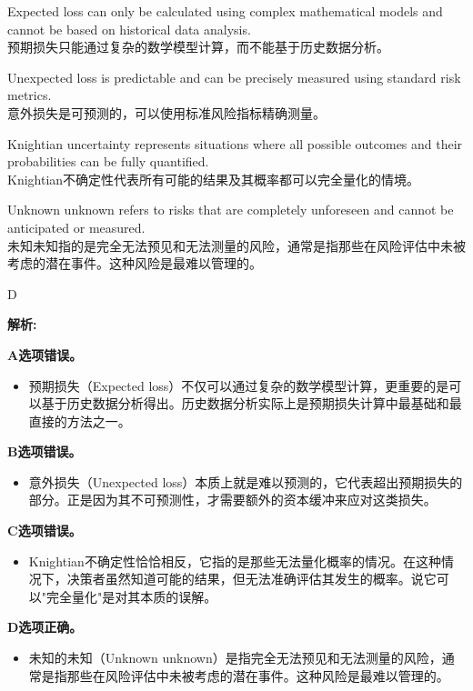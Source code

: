 \documentclass{article}
\newenvironment{explanation}
{\textbf{解析:}\par}
{\par}
\begin{document}
\begin{choices}
    \item Expected loss can only be calculated using complex mathematical models and cannot be based on historical data analysis.\\
    预期损失只能通过复杂的数学模型计算，而不能基于历史数据分析。
    \item Unexpected loss is predictable and can be precisely measured using standard risk metrics.\\
    意外损失是可预测的，可以使用标准风险指标精确测量。
    
    \item Knightian uncertainty represents situations where all possible outcomes and their probabilities can be fully quantified.\\
    Knightian不确定性代表所有可能的结果及其概率都可以完全量化的情境。
    
    \item Unknown unknown refers to risks that are completely unforeseen and cannot be anticipated or measured.\\
    未知未知指的是完全无法预见和无法测量的风险，通常是指那些在风险评估中未被考虑的潜在事件。这种风险是最难以管理的。
\end{choices}

\begin{correctanswer}
    D
\end{correctanswer}

\begin{explanation}
    \textbf{A选项错误。}
    \begin{itemize}
        \item 预期损失（Expected loss）不仅可以通过复杂的数学模型计算，更重要的是可以基于历史数据分析得出。历史数据分析实际上是预期损失计算中最基础和最直接的方法之一。
    \end{itemize}
    
    \textbf{B选项错误。}
    \begin{itemize}
        \item 意外损失（Unexpected loss）本质上就是难以预测的，它代表超出预期损失的部分。正是因为其不可预测性，才需要额外的资本缓冲来应对这类损失。
    \end{itemize}
    
    
    \textbf{C选项错误。}
    \begin{itemize}
        \item Knightian不确定性恰恰相反，它指的是那些无法量化概率的情况。在这种情况下，决策者虽然知道可能的结果，但无法准确评估其发生的概率。说它可以"完全量化"是对其本质的误解。
    \end{itemize}

    \textbf{D选项正确。}
    \begin{itemize}
        \item 未知的未知（Unknown unknown）是指完全无法预见和无法测量的风险，通常是指那些在风险评估中未被考虑的潜在事件。这种风险是最难以管理的。
    \end{itemize}

\end{explanation}
\end{document}
